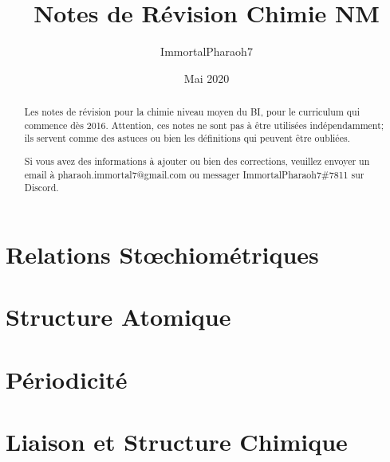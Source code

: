\documentclass[french, a4paper, 12pt]{article}
\author{ImmortalPharaoh7}
\title{Notes de Révision Chimie NM}
\date{Mai 2020}
\begin{document}
\begin{titlepage}
\maketitle
\begin{abstract}
Les notes de révision pour la chimie niveau moyen du BI, pour le curriculum qui commence dès 2016. Attention, ces notes ne sont pas à être utilisées indépendamment; ils servent comme des astuces ou bien les définitions qui peuvent être oubliées.

Si vous avez des informations à ajouter ou bien des corrections, veuillez envoyer un email à pharaoh.immortal7@gmail.com ou messager ImmortalPharaoh7\#7811 sur Discord.
\end{abstract}
\end{titlepage}

\tableofcontents
\pagebreak


\section{Relations Stœchiométriques}
\pagebreak

\section{Structure Atomique}
\pagebreak

\section{Périodicité}
\pagebreak

\section{Liaison et Structure Chimique}
\pagebreak
\end{document}
